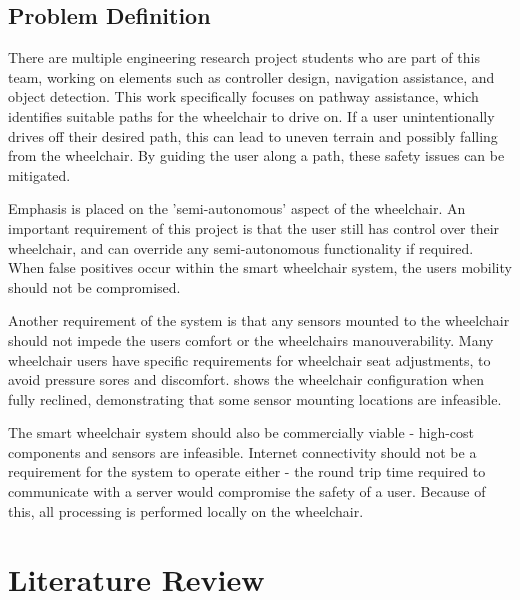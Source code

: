 \documentclass[12pt]{article}
\begin{document}
\pagebreak
\subsection{Problem Definition}
There are multiple engineering research project students who are part of this team,
working on elements such as controller design, navigation assistance, and object detection.
This work specifically focuses on pathway assistance, which identifies suitable
paths for the wheelchair to drive on. If a user unintentionally drives off their desired path,
this can lead to uneven terrain and possibly falling from the wheelchair.
By guiding the user along a path, these safety issues can be mitigated.

Emphasis is placed on the 'semi-autonomous' aspect of the wheelchair.
An important requirement of this project is that the user still
has control over their wheelchair, and can override any semi-autonomous functionality
if required. When false positives occur within the smart wheelchair system,
the users mobility should not be compromised.

Another requirement of the system is that any sensors mounted to the wheelchair
should not impede the users comfort or the wheelchairs manouverability.
Many wheelchair users have specific requirements for wheelchair seat adjustments,
to avoid pressure sores and discomfort.  shows the
wheelchair configuration when fully reclined, demonstrating that some sensor mounting locations
are infeasible.

The smart wheelchair system should also be commercially viable - high-cost
components and sensors are infeasible. Internet connectivity should not be a requirement
for the system to operate either - the round trip time required to communicate with a server
would compromise the safety of a user. Because of this, all processing is performed locally
on the wheelchair.

\pagebreak





\section{Literature Review}
\end{document}
